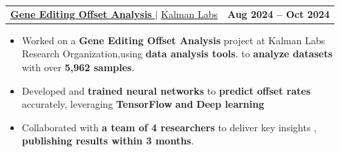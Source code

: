 \documentclass[letterpaper,9pt]{article}
\makeatletter
\newcommand{\resumeItem}[1]{
  \item\small{
    {#1 \vspace{-2pt}}
  }
}
\newcommand{\resumeProjectHeading}[2]{
    \item
    \begin{tabular*}{1.001\textwidth}{l@{\extracolsep{\fill}}r}
      \small#1 & \textbf{\small #2}\\
    \end{tabular*}\vspace{-7pt}
}
\newcommand{\resumeItemListStart}{\begin{itemize}}
\newcommand{\resumeItemListEnd}{\end{itemize}\vspace{-5pt}}
\makeatother
\begin{document}
\resumeProjectHeading
{\href{https://medium.com/@company_56220/dna-rna-and-proteins-structure-and-function-0121eab2a4c1}{\textbf{\large{\underline{Gene Editing Offset Analysis}}} {\raisebox{-0.1\height}\faExternalLink}} $|$ \large{\underline{Kalman Labs}}}{Aug 2024 -- Oct 2024}
\resumeItemListStart
\resumeItem {\normalsize{Worked on a \textbf{Gene Editing Offset Analysis} project at Kalman Labs Research Organization,using \textbf{data analysis tools}. to \textbf{analyze datasets} with over \textbf{5,962 samples}.}}
\resumeItem{\normalsize{Developed and \textbf{trained neural networks} to \textbf{predict offset rates} accurately, leveraging \textbf{TensorFlow} \textbf{and} \textbf{Deep learning}}}
\resumeItem{\normalsize{Collaborated with \textbf{a team of 4 researchers} to deliver key insights , \textbf{publishing results within 3 months}.}}
\resumeItemListEnd
\vspace{-13pt}



\end{document}
